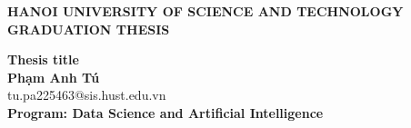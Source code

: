 \documentclass[DoAn.tex]{subfiles}
\begin{document}
\begin{titlepage}
\thispagestyle{empty}
\begin{center}

{\textbf{\large{HANOI UNIVERSITY OF SCIENCE AND TECHNOLOGY}}}\\[4cm]

{\textbf{\huge{GRADUATION THESIS}}}\\[1cm]
{\textbf{\Large{Thesis title}}\\[1cm]

{\textbf{\large{Phạm Anh Tú}}}\\
{\large{tu.pa225463@sis.hust.edu.vn}}\\[0.5cm]

{\textbf{\large{Program: Data Science and Artificial Intelligence
}}}\\

\vspace{4cm}
\begin{table}[H]
\centering
{}
\end{table}}
\end{center}



\end{titlepage}
\end{document}
